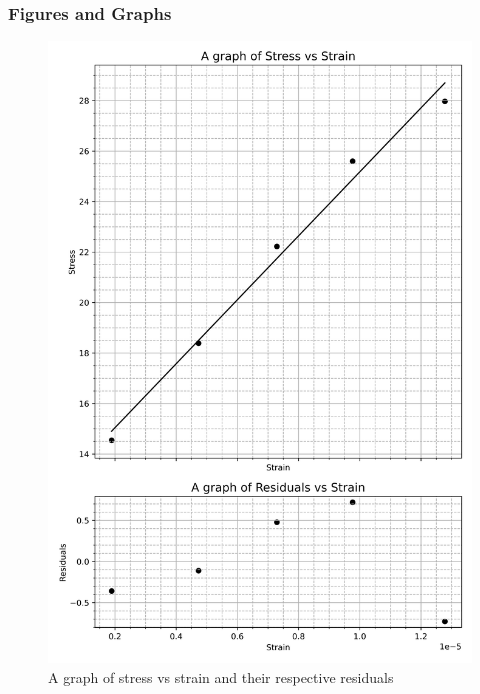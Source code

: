 \documentclass[12pt, a4paper]{article}
\begin{document}
\subsubsection{Figures and Graphs}
\begin{figure}[H]
    \centering
    \includegraphics[width = \textwidth]{1Plot1.png}
    \caption{A graph of stress vs strain and their respective residuals}
    \label{fig:Fig 1.1}
\end{figure}
\end{document}
